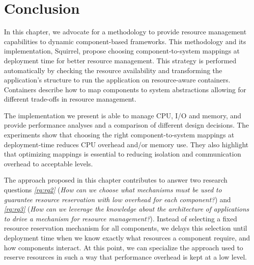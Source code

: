 
\section{Conclusion} \label{sec:squirrel-conclusions}


In this chapter, we advocate for a methodology to provide resource management capabilities to dynamic component-based frameworks.
This methodology and its implementation, Squirrel, propose choosing component-to-system mappings at deployment time for better resource management.
This strategy is performed automatically by checking the resource availability and transforming the application's structure to run the application on resource-aware containers.
Containers describe how to map components to system abstractions
allowing for different trade-offs in resource management.

The implementation we present is able to manage CPU, I/O and memory, and provide performance analyses and a comparison of different design decisions.
The experiments show that choosing the right component-to-system mappings at deployment-time reduces CPU overhead and/or memory use.
They also highlight that optimizing mappings is essential to reducing isolation and communication overhead to acceptable levels.

The approach proposed in this chapter contributes to answer two research questions \textit{\ref{rq:rq2}} (\textit{How can we choose what mechanisms must be used to guarantee resource reservation with low overhead for each component?}) and \textit{\ref{rq:rq3}} (\textit{How can we leverage the knowledge about the architecture of applications to drive a mechanism for resource management?}).
Instead of selecting a fixed resource reservation mechanism for all components, we delays this selection until deployment time when we know exactly what resources a component require, and how components interact.
At this point, we can specialize the approach used to reserve resources in such a way that performance overhead is kept at a low level.

